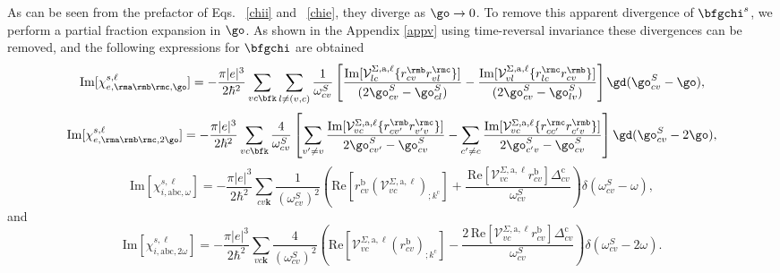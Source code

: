 \documentclass[floatfix,prb,aps,superscriptaddress,11pt,preprint,letterpaper]{revtex4}
\begin{document}
As can be seen from the prefactor of Eqs. ~\eqref{chii} and
~\eqref{chie}, they  
diverge as $\go\to 0$. To remove this apparent  
divergence of $\bfgchi^s$, we perform 
a partial fraction  expansion in $\go$. 
As shown in the Appendix \ref{appv} 
using time-reversal invariance these divergences can be removed, and
the following expressions for $\bfgchi$ are obtained  
\begin{equation}\label{calvimchiewn}
\mathrm{Im}[\chi_{e,\rma\rmb\rmc,\go}^{s,\ell}] =
-\frac{\pi |e|^3}{2\hbar^2}\sum_{vc\bfk}\sum_{l\neq(v,c)}\frac{1}{\omega^{S}_{cv}}
\left[
\frac{\mathrm{Im}[\mathcal{V}^{\Sigma,\text{a},\ell}_{lc}\{r^{\rmb}_{cv}r^{\rmc}_{vl}\}]}
{(2\go^S_{cv}-\go^S_{cl})} 
-\frac{\mathrm{Im}[\mathcal{V}^{\Sigma,\text{a},\ell}_{vl}\{r^{\rmc}_{lc}r^{\rmb}_{cv}\}]}
{(2\go^S_{cv}-\go^S_{lv})}
\right]\gd(\go^S_{cv}-\go),
\end{equation}  
\begin{equation}\label{calvimchie2wn}
\mathrm{Im}[\chi_{e,\rma\rmb\rmc,2\go}^{s,\ell}] =
-\frac{\pi |e|^3}{2\hbar^2}\sum_{vc\bfk}\frac{4}{\omega^{S}_{cv}}
\left[
\sum_{v'\ne
  v}\frac{\mathrm{Im}[\mathcal{V}^{\Sigma,\text{a},\ell}_{vc}\{r^{\rmb}_{cv'}r^{\rmc}_{v'v}\}]}
{2\go^S_{cv'}-\go^S_{cv}}
- \sum_{c'\ne
  c}\frac{\mathrm{Im}[\mathcal{V}^{\Sigma,\text{a},\ell}_{vc}\{r^{\rmc}_{cc'}r^{\rmb}_{c'v}\}]}
{2\go^S_{c'v}-\go^S_{cv}}
\right]\gd(\go^S_{cv}-2\go),
\end{equation}
\begin{equation}\label{calvimchiwn}
\mathrm{Im}[\chi_{i,\text{a}\text{b}\text{c},\omega}^{s,\ell}]
= -\frac{\pi\vert e\vert^3}{2\hbar^2}\sum_{cv\mathbf{k}}\frac{1}{(\omega^{S}_{cv})^{2}}
\left(
\mathrm{Re}\left[r^{\text{b}}_{cv}\left(\mathcal{V}^{\Sigma,\text{a},\ell}_{vc}\right)_{;k^{\text{c}}}\right]
+\frac{\,\mathrm{Re}\left[\mathcal{V}^{\Sigma,\text{a},\ell}_{vc}r^{\text{b}}_{cv}\right]
\Delta^{\text{c}}_{cv}}{\omega^{S}_{cv}} 
\right)\delta(\omega^{S}_{cv}-\omega),
\end{equation}
and
\begin{equation}\label{calvimchi2wn}
\mathrm{Im}[\chi_{i,\text{a}\text{b}\text{c},2\omega}^{s,\ell}] 
=
 -\frac{\pi \vert
   e\vert^{3}}{2\hbar^2}\sum_{vc\mathbf{k}}\frac{4}{(\omega^{S}_{cv})^{2}}
\left(\mathrm{Re}\left[\mathcal{V}^{\Sigma,\text{a},\ell}_{vc}\left(r^{\text{b}}_{cv}\right)_{;k^{\text{c}}}
\right] -
\frac{2\,\mathrm{Re}\left[\mathcal{V}^{\Sigma,\text{a},\ell}_{vc}r^{\text{b}}_{cv}\right]
\Delta^{\text{c}}_{cv}}{\omega^{S}_{cv}}\right)\delta(\omega^{S}_{cv}-2\omega).
\end{equation}
\end{document}
